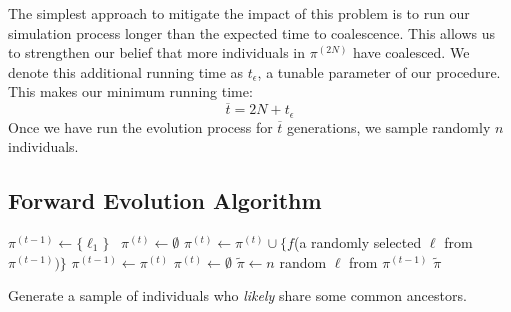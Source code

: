 The simplest approach to mitigate the impact of this problem is to run our simulation process longer than the expected
time to coalescence.
This allows us to strengthen our belief that more individuals in $\pi^{(2N)}$ have coalesced.
We denote this additional running time as $t_\epsilon$, a tunable parameter of our procedure.
This makes our minimum running time:
\begin{equation}
    \overbar{t} = 2N + t_\epsilon
\end{equation}
Once we have run the evolution process for $\overbar{t}$ generations, we sample randomly $n$ individuals.

\subsection{Forward Evolution Algorithm}\label{subsec:forwardEvolutionAlgorithm}
\begin{algorithm}[t]
    \SetAlgoLined
    \DontPrintSemicolon
     {
        $\pi^{(t-1)} \gets \{ \ell_1 \}$  \
        $\pi^{(t)} \gets \emptyset$ \;
         {
             {
                $\pi^{(t)} \gets \pi^{(t)} \cup \{f$(a randomly selected $\ell$ from $\pi^{(t-1)} )\}$ \;
            }
            $\pi^{(t-1)} \gets \pi^{(t)}$ \;
            $\pi^{(t)} \gets \emptyset$ \;
        }
        $\tilde{\pi} \gets n$ random $\ell$ from $\pi^{(t-1)}$ \;
        \Return $\tilde{\pi}$ \;
    }
    \caption{Generate a sample of individuals who \emph{likely} share some common ancestors.}
    \label{alg:forwardEvolution}
\end{algorithm}

